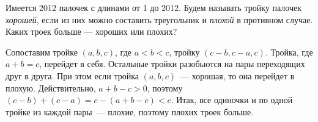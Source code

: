 \problem
Имеется 2012 палочек с длинами от 1 до 2012.
Будем называть тройку палочек \emph{хорошей}, если из них можно составить
треугольник и \emph{плохой} в противном случае.
Каких троек больше --- хороших или плохих?

\solution
Сопоставим тройке $(a, b, c)$, где $a < b < c$, тройку $(c - b, c - a, c)$.
Тройка, где $a + b = c$, перейдет в себя.
Остальные тройки разобьются на пары переходящих друг в друга.
При этом если тройка $(a, b, c)$~--- хорошая, то она перейдет в плохую.
Действительно, $a + b - c > 0$, поэтому
$(c - b) + (c - a) = c - (a + b - c) < c$.
Итак, все одиночки и по одной тройке из каждой пары~--- плохие, поэтому плохих
троек больше.

\endproblem
